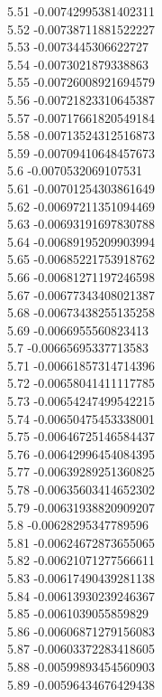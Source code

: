 {5.51	-0.00742995381402311\\
5.52	-0.00738711881522227\\
5.53	-0.0073445306622727\\
5.54	-0.0073021879338863\\
5.55	-0.00726008921694579\\
5.56	-0.00721823310645387\\
5.57	-0.00717661820549184\\
5.58	-0.00713524312516873\\
5.59	-0.00709410648457673\\
5.6	-0.0070532069107531\\
5.61	-0.00701254303861649\\
5.62	-0.00697211351094469\\
5.63	-0.00693191697830788\\
5.64	-0.00689195209903994\\
5.65	-0.00685221753918762\\
5.66	-0.00681271197246598\\
5.67	-0.00677343408021387\\
5.68	-0.00673438255135258\\
5.69	-0.0066955560823413\\
5.7	-0.00665695337713583\\
5.71	-0.00661857314714396\\
5.72	-0.00658041411117785\\
5.73	-0.00654247499542215\\
5.74	-0.00650475453338001\\
5.75	-0.00646725146584437\\
5.76	-0.00642996454084395\\
5.77	-0.00639289251360825\\
5.78	-0.00635603414652302\\
5.79	-0.00631938820909207\\
5.8	-0.00628295347789596\\
5.81	-0.00624672873655065\\
5.82	-0.00621071277566611\\
5.83	-0.00617490439281138\\
5.84	-0.00613930239246367\\
5.85	-0.0061039055859829\\
5.86	-0.00606871279156083\\
5.87	-0.00603372283418605\\
5.88	-0.00599893454560903\\
5.89	-0.00596434676429438\\
}
